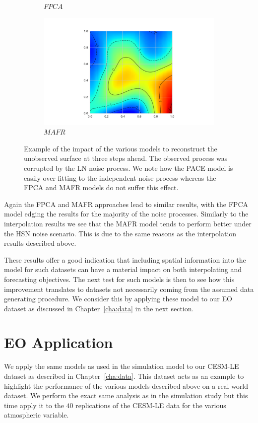 \begin{figure}
\begin{subfigure}[b]{0.45\textwidth}
		\caption{$FPCA$}
		\label{fig:ftsm_res_recon_fpca}
	\end{subfigure}
	\begin{subfigure}[b]{0.45\textwidth}
		\includegraphics[width=\textwidth]{ftsm_res_recon_example_mafr}
		\caption{$MAFR$}
		\label{fig:ftsm_res_recon_mafr}
	\end{subfigure}  
	\caption[Example of the impact of the various models to reconstruct the unobserved surface at three steps ahead.]{Example of the impact of the various models to reconstruct the unobserved surface at three steps ahead. The observed process was corrupted by the LN noise process. We note how the PACE model is easily over fitting to the independent noise process whereas the FPCA and MAFR models do not suffer this effect.}
	\label{fig:ftsm_res_recon}
\end{figure}

Again the FPCA and MAFR approaches lead to similar results, with the FPCA model edging the results for the majority of the noise processes.
Similarly to the interpolation results we see that the MAFR model tends to perform better under the HSN noise scenario. 
This is due to the same reasons as the interpolation results described above. 

These results offer a good indication that including spatial information into the model for such datasets can have a material impact on both interpolating and forecasting objectives. 
The next test for such models is then to see how this improvement translates to datasets not necessarily coming from the assumed data generating procedure.
We consider this by applying these model to our EO dataset as discussed in Chapter~\ref{cha:data} in the next section. 

\section{EO Application \label{sec:ftsm_eo}}
We apply the same models as used in the simulation model to our CESM-LE dataset as described in Chapter~\ref{cha:data}.
This dataset acts as an example to highlight the performance of the various models described above on a real world dataset. 
We perform the exact same analysis as in the simulation study but this time apply it to the $40$ replications of the CESM-LE data for the various atmospheric variable. 

